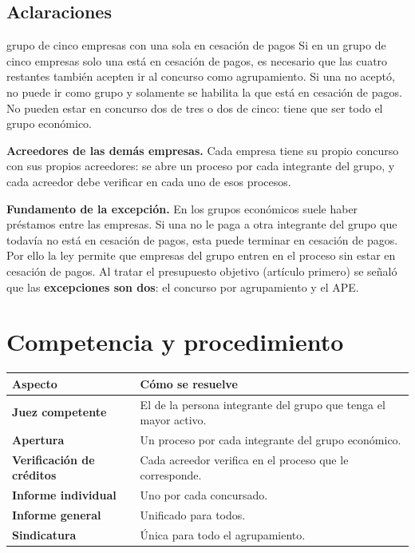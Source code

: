 \documentclass[12pt,oneside]{book}
\begin{document}
\subsection{Aclaraciones}

\begin{example}{grupo de cinco empresas con una sola en cesación de pagos}
Si en un grupo de cinco empresas solo una está en cesación de pagos, es necesario que las cuatro restantes también acepten ir al concurso como agrupamiento. Si una no aceptó, no puede ir como grupo y solamente se habilita la que está en cesación de pagos. No pueden estar en concurso dos de tres o dos de cinco: tiene que ser todo el grupo económico.
\end{example}

\textbf{Acreedores de las demás empresas.} Cada empresa tiene su propio concurso con sus propios acreedores: se abre un proceso por cada integrante del grupo, y cada acreedor debe verificar en cada uno de esos procesos.

\textbf{Fundamento de la excepción.} En los grupos económicos suele haber préstamos entre las empresas. Si una no le paga a otra integrante del grupo que todavía no está en cesación de pagos, esta puede terminar en cesación de pagos. Por ello la ley permite que empresas del grupo entren en el proceso sin estar en cesación de pagos. Al tratar el presupuesto objetivo (artículo primero) se señaló que las \textbf{excepciones son dos}: el concurso por agrupamiento y el APE.

\section{Competencia y procedimiento}

\begin{table}[H]
\centering
\small
\begin{tabularx}{\textwidth}{@{}>{\raggedright\arraybackslash}p{4.2cm}Y@{}}
\toprule
\textbf{Aspecto} & \textbf{Cómo se resuelve} \\
\midrule
\textbf{Juez competente} & El de la persona integrante del grupo que tenga el mayor activo. \\
\textbf{Apertura} & Un proceso por cada integrante del grupo económico. \\
\textbf{Verificación de créditos} & Cada acreedor verifica en el proceso que le corresponde. \\
\textbf{Informe individual} & Uno por cada concursado. \\
\textbf{Informe general} & Unificado para todos. \\
\textbf{Sindicatura} & Única para todo el agrupamiento. \\
\bottomrule
\end{tabularx}
\end{table}
\end{document}

